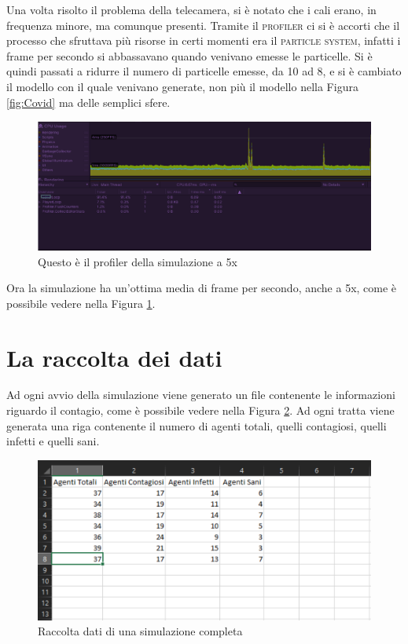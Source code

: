 \documentclass[12pt, openany]{book}
\begin{document}
 	Una volta risolto il problema della telecamera, si è notato che i cali erano, in frequenza minore, ma comunque presenti. Tramite il \textsc{profiler} ci si è accorti che il processo che sfruttava più risorse in certi momenti era il \textsc{particle system}, infatti i frame per secondo si abbassavano quando venivano emesse le particelle. Si è quindi passati a ridurre il numero di particelle emesse, da 10 ad 8, e si è cambiato il modello con il quale venivano generate, non più il modello nella Figura \ref{fig:Covid} ma delle semplici sfere.
 	\begin{figure}[H]
 		\centering
 		\includegraphics[width=1\linewidth]{"Immagini/ProfilerBuoniFPS.png"}
 		\caption{Questo è il profiler della simulazione a 5x}
 		\label{fig:ProfilerBuoniFPS}
 	\end{figure} 
 	Ora la simulazione ha un'ottima media di frame per secondo, anche a 5x, come è possibile vedere nella Figura \ref{fig:ProfilerBuoniFPS}.
 	\section{La raccolta dei dati}
 	Ad ogni avvio della simulazione viene generato un file contenente le informazioni riguardo il contagio, come è possibile vedere nella Figura \ref{fig:csv}. Ad ogni tratta viene generata una riga contenente il numero di agenti totali, quelli contagiosi, quelli infetti e quelli sani.
 	\begin{figure}[H]
 		\centering
 		\includegraphics[width=1\linewidth]{"Immagini/csv.png"}
 		\caption{Raccolta dati di una simulazione completa}
 		\label{fig:csv}
 	\end{figure}
	
	
\end{document}
